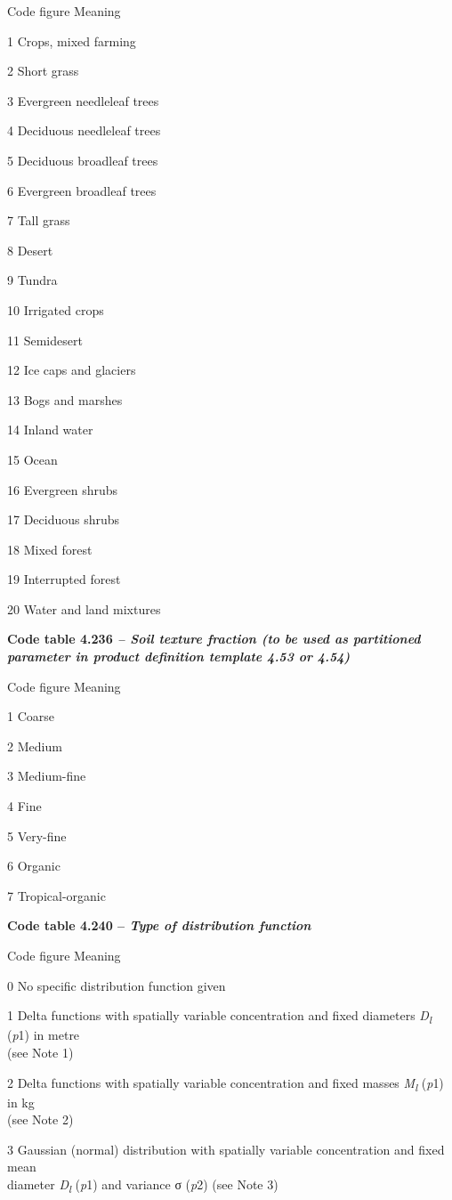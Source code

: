 Code figure Meaning

1 Crops, mixed farming

2 Short grass

3 Evergreen needleleaf trees

4 Deciduous needleleaf trees

5 Deciduous broadleaf trees

6 Evergreen broadleaf trees

7 Tall grass

8 Desert

9 Tundra

10 Irrigated crops

11 Semidesert

12 Ice caps and glaciers

13 Bogs and marshes

14 Inland water

15 Ocean

16 Evergreen shrubs

17 Deciduous shrubs

18 Mixed forest

19 Interrupted forest

20 Water and land mixtures

\textbf{Code table 4.236 \emph{-- Soil texture fraction (to be used as partitioned parameter in product definition template 4.53 or 4.54)}}

Code figure Meaning

1 Coarse

2 Medium

3 Medium-fine

4 Fine

5 Very-fine

6 Organic

7 Tropical-organic

\textbf{Code table 4.240 -- \emph{Type of distribution function}}

Code figure Meaning

0 No specific distribution function given

1 Delta functions with spatially variable concentration and fixed diameters \emph{D\textsubscript{l}} (\emph{p}1) in metre\\
(see Note 1)

2 Delta functions with spatially variable concentration and fixed masses \emph{M\textsubscript{l}} (\emph{p}1) in kg\\
(see Note 2)

3 Gaussian (normal) distribution with spatially variable concentration and fixed mean\\
diameter \emph{D\textsubscript{l}} (\emph{p}1) and variance σ (\emph{p}2) (see Note 3)

